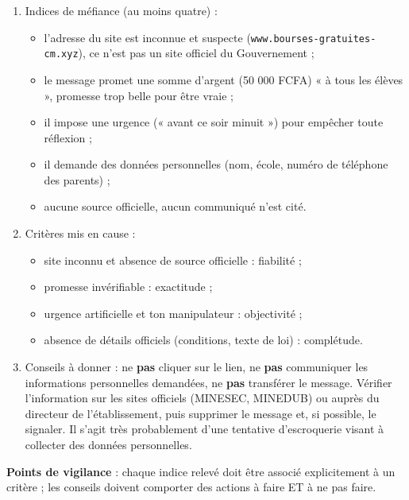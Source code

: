 \documentclass[11pt]{article}
\newcommand{\cle}[1]{{\popxbold\color{popdark}#1}}
\begin{document}
\begin{corrige}
\begin{enumerate}
\item Indices de méfiance (au moins quatre) :
\begin{itemize}
\item l'adresse du site est inconnue et suspecte (\texttt{www.bourses-gratuites-cm.xyz}), ce n'est pas un site officiel du Gouvernement ;
\item le message promet une somme d'argent (50 000 FCFA) « à tous les élèves », promesse trop belle pour être vraie ;
\item il impose une urgence (« avant ce soir minuit ») pour empêcher toute réflexion ;
\item il demande des données personnelles (nom, école, numéro de téléphone des parents) ;
\item aucune source officielle, aucun communiqué n'est cité.
\end{itemize}
\item Critères mis en cause :
\begin{itemize}
\item site inconnu et absence de source officielle : \cle{fiabilité} ;
\item promesse invérifiable : \cle{exactitude} ;
\item urgence artificielle et ton manipulateur : \cle{objectivité} ;
\item absence de détails officiels (conditions, texte de loi) : \cle{complétude}.
\end{itemize}
\item Conseils à donner : ne \textbf{pas} cliquer sur le lien, ne \textbf{pas} communiquer les informations personnelles demandées, ne \textbf{pas} transférer le message. Vérifier l'information sur les sites officiels (MINESEC, MINEDUB) ou auprès du directeur de l'établissement, puis supprimer le message et, si possible, le signaler. Il s'agit très probablement d'une tentative d'escroquerie visant à collecter des données personnelles.
\end{enumerate}
\textbf{Points de vigilance} : chaque indice relevé doit être associé explicitement à un critère ; les conseils doivent comporter des actions à faire ET à ne pas faire.
\end{corrige}
\end{document}
